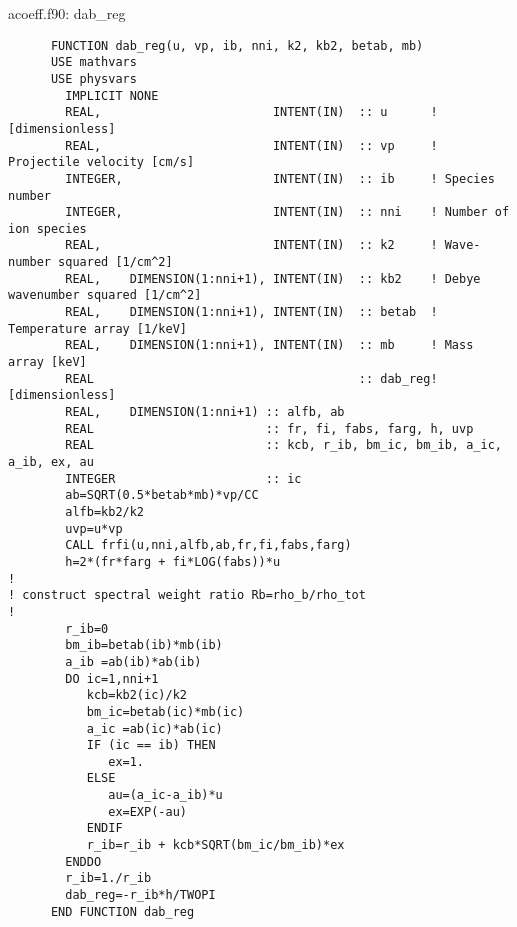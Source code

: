 \documentclass[preprint,12pt,eqsecnum,nofootinbib,amsmath,amssymb]{revtex4}
\begin{document}
{{\vskip0.4cm
\noindent
acoeff.f90: dab\_reg
{
\baselineskip 10pt
\begin{verbatim}
      FUNCTION dab_reg(u, vp, ib, nni, k2, kb2, betab, mb)
      USE mathvars
      USE physvars
        IMPLICIT NONE
        REAL,                        INTENT(IN)  :: u      ! [dimensionless]
        REAL,                        INTENT(IN)  :: vp     ! Projectile velocity [cm/s]
        INTEGER,                     INTENT(IN)  :: ib     ! Species number
        INTEGER,                     INTENT(IN)  :: nni    ! Number of ion species
        REAL,                        INTENT(IN)  :: k2     ! Wave-number squared [1/cm^2]
        REAL,    DIMENSION(1:nni+1), INTENT(IN)  :: kb2    ! Debye wavenumber squared [1/cm^2]
        REAL,    DIMENSION(1:nni+1), INTENT(IN)  :: betab  ! Temperature array [1/keV]
        REAL,    DIMENSION(1:nni+1), INTENT(IN)  :: mb     ! Mass array [keV]
        REAL                                     :: dab_reg! [dimensionless]
        REAL,    DIMENSION(1:nni+1) :: alfb, ab
        REAL                        :: fr, fi, fabs, farg, h, uvp
        REAL                        :: kcb, r_ib, bm_ic, bm_ib, a_ic, a_ib, ex, au
        INTEGER                     :: ic
        ab=SQRT(0.5*betab*mb)*vp/CC
        alfb=kb2/k2
        uvp=u*vp
        CALL frfi(u,nni,alfb,ab,fr,fi,fabs,farg)
        h=2*(fr*farg + fi*LOG(fabs))*u
!
! construct spectral weight ratio Rb=rho_b/rho_tot
!
        r_ib=0
        bm_ib=betab(ib)*mb(ib)
        a_ib =ab(ib)*ab(ib)
        DO ic=1,nni+1
           kcb=kb2(ic)/k2
           bm_ic=betab(ic)*mb(ic)
           a_ic =ab(ic)*ab(ic)
           IF (ic == ib) THEN
              ex=1.
           ELSE
              au=(a_ic-a_ib)*u
              ex=EXP(-au)
           ENDIF
           r_ib=r_ib + kcb*SQRT(bm_ic/bm_ib)*ex
        ENDDO      
        r_ib=1./r_ib
        dab_reg=-r_ib*h/TWOPI
      END FUNCTION dab_reg
\end{verbatim}
}

}}
\end{document}
